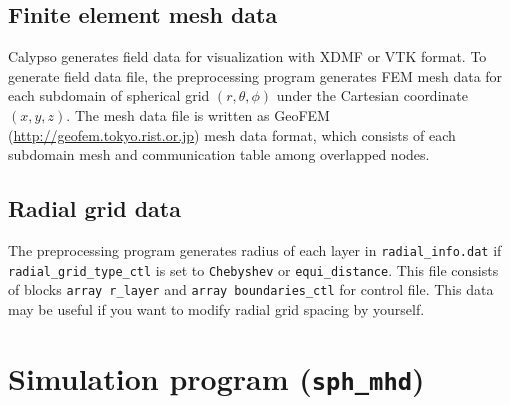 \subsection{Finite element mesh data}
Calypso generates field data for visualization with XDMF or VTK format. To generate field data file, the preprocessing program generates FEM mesh data for each subdomain of spherical grid $(r,\theta,\phi)$ under the Cartesian coordinate $(x,y,z)$. The mesh data file is written as GeoFEM (\url{http://geofem.tokyo.rist.or.jp}) mesh data format, which consists of each subdomain mesh and communication table among overlapped nodes. 

\subsection{Radial grid data}
The preprocessing program generates radius of each layer in \verb|radial_info.dat| if \verb|radial_grid_type_ctl| is set to \verb|Chebyshev| or \verb|equi_distance|. This file consists of blocks \verb|array r_layer| and \verb|array boundaries_ctl| for control file. This data may be useful if you want to modify radial grid spacing by yourself.


\newpage
\section{Simulation program ({\tt sph\_mhd})}
\label{section:sph_mhd}
%

